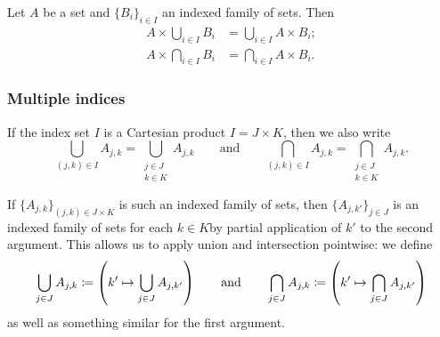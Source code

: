 \begin{lemma}
Let $A$ be a set and $\{B_i\}_{i\in I}$ an indexed family of sets. Then
\begin{align*}
A\times \bigcup_{i\in I} B_i &= \bigcup_{i\in I}A\times B_i; \\
A\times \bigcap_{i\in I} B_i &= \bigcap_{i\in I}A\times B_i.
\end{align*}
\end{lemma}

\subsubsection{Multiple indices}
If the index set $I$ is a Cartesian product $I=J\times K$, then we also write
\[ \bigcup_{(j,k)\in I} A_{j,k} = \bigcup_{\substack{j\in J \\ k\in K}} A_{j,k} \qquad\text{and}\qquad \bigcap_{(j,k)\in I} A_{j,k} = \bigcap_{\substack{j\in J \\ k\in K}} A_{j,k}. \]

If $\{A_{j,k}\}_{(j,k) \in J\times K}$ is such an indexed family of sets, then $\{A_{j,k'}\}_{j\in J}$ is an indexed family of sets for each $k\in K$by partial application of $k'$ to the second argument. This allows us to apply union and intersection pointwise: we define
\[ \bigcup_{j\in J}A_{j,k} \coloneqq \left(k'\mapsto \bigcup_{j\in J}A_{j,k'}\right) \qquad\text{and}\qquad \bigcap_{j\in J}A_{j,k} \coloneqq \left(k'\mapsto \bigcap_{j\in J}A_{j,k'}\right) \]
as well as something similar for the first argument.

